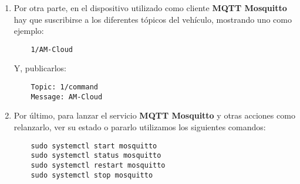 \begin{enumerate}
\item Por otra parte, en el dispositivo utilizado como cliente \textbf{MQTT Mosquitto} hay que suscribirse a los diferentes tópicos del vehículo, mostrando uno como ejemplo:
\begin{lstlisting}
	1/AM-Cloud
\end{lstlisting}
Y, publicarlos:
\begin{lstlisting}
	Topic: 1/command
	Message: AM-Cloud
\end{lstlisting}


\item Por último, para lanzar el servicio \textbf{MQTT Mosquitto} y otras acciones como relanzarlo, ver su estado o pararlo utilizamos los siguientes comandos:
\begin{lstlisting}
	sudo systemctl start mosquitto
	sudo systemctl status mosquitto
	sudo systemctl restart mosquitto
	sudo systemctl stop mosquitto
\end{lstlisting}

\end{enumerate}